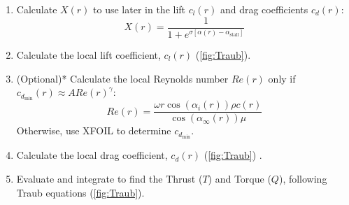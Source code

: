 \documentclass{Format}
\begin{document}
\begin{enumerate}
    \item Calculate \(X(r)\) to use later in the lift \(c_l(r)\) and drag coefficients \(c_d(r)\):
    \begin{equation}
        X(r) = \frac{1}{1 + e^{\sigma [\alpha(r) - \alpha_{\text{stall}}]}}
    \end{equation}
    \item Calculate the local lift coefficient, \( c_l(r) \) (\autoref{fig:Traub}).
    \item (Optional)* Calculate the local Reynolds number \( Re(r) \) only if \( c_{d_{\text{min}}}(r) \approx A Re(r)^{\gamma} \):
    \begin{equation}
        Re(r) = \frac{\omega r \cos(\alpha_i(r)) \rho c(r)}{\cos(\alpha_{\infty}(r)) \mu}
    \end{equation}
    Otherwise, use XFOIL to determine \( c_{d_{\text{min}}} \).
    
    \item Calculate the local drag coefficient, \( c_d(r) \) (\autoref{fig:Traub}) .
    
    \item Evaluate and integrate to find the Thrust  (\(T\)) and Torque (\(Q\)), following Traub equations (\autoref{fig:Traub}).
\end{enumerate}


    
\end{document}
